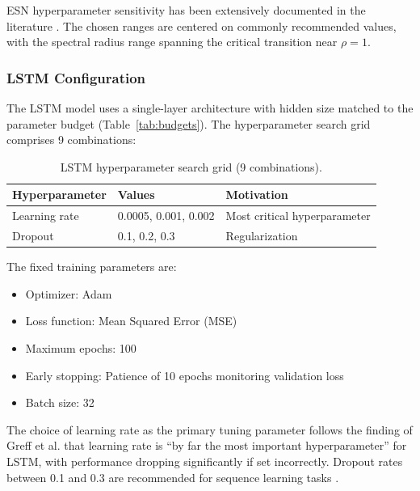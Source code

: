 ESN hyperparameter sensitivity has been extensively documented in the literature \cite{lukosevicius2012practical, matzner2022hyperparameter, mwamsojo2024stochastic}. The chosen ranges are centered on commonly recommended values, with the spectral radius range spanning the critical transition near $\rho = 1$.

\subsubsection{LSTM Configuration}
\label{sec:lstm_config}

The LSTM model uses a single-layer architecture with hidden size matched to the parameter budget (Table~\ref{tab:budgets}). The hyperparameter search grid comprises 9 combinations:

\begin{table}[H]
\centering
\caption{LSTM hyperparameter search grid (9 combinations).}
\label{tab:lstm_grid}
\begin{tabular}{@{}lll@{}}
\toprule
Hyperparameter & Values & Motivation \\
\midrule
Learning rate & 0.0005, 0.001, 0.002 & Most critical hyperparameter \cite{greff2017lstm} \\
Dropout       & 0.1, 0.2, 0.3       & Regularization \cite{zaremba2014recurrent} \\
\bottomrule
\end{tabular}
\end{table}

The fixed training parameters are:
\begin{itemize}
    \item Optimizer: Adam \cite{kingma2015adam}
    \item Loss function: Mean Squared Error (MSE)
    \item Maximum epochs: 100
    \item Early stopping: Patience of 10 epochs monitoring validation loss
    \item Batch size: 32
\end{itemize}

The choice of learning rate as the primary tuning parameter follows the finding of Greff et al. \cite{greff2017lstm} that learning rate is ``by far the most important hyperparameter'' for LSTM, with performance dropping significantly if set incorrectly. Dropout rates between 0.1 and 0.3 are recommended for sequence learning tasks \cite{gal2016dropout}.

